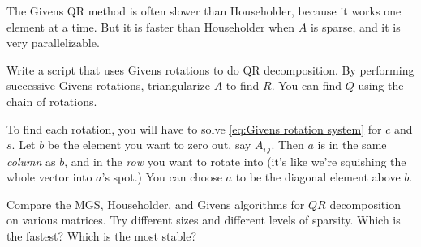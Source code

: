 The Givens QR method is often slower than Householder, because it works one element at a time. But it is faster than Householder when $A$ is sparse, and it is very parallelizable.

\begin{problem}
Write a script that uses Givens rotations to do QR decomposition. By performing successive Givens rotations, triangularize $A$ to find $R$. You can find $Q$ using the chain of rotations.

To find each rotation, you will have to solve \eqref{eq:Givens rotation system} for $c$ and $s$. Let $b$ be the element you want to zero out, say $A_{i\,j}$. Then $a$ is in the same \emph{column} as $b$, and in the \emph{row} you want to rotate into (it's like we're squishing the whole vector into $a$'s spot.) You can choose $a$ to be the diagonal element above $b$.
\end{problem}

\begin{problem} 
Compare the MGS, Householder, and Givens algorithms for $QR$ decomposition on various matrices. Try different sizes and different levels of sparsity. Which is the fastest? Which is the most stable?
\end{problem}



